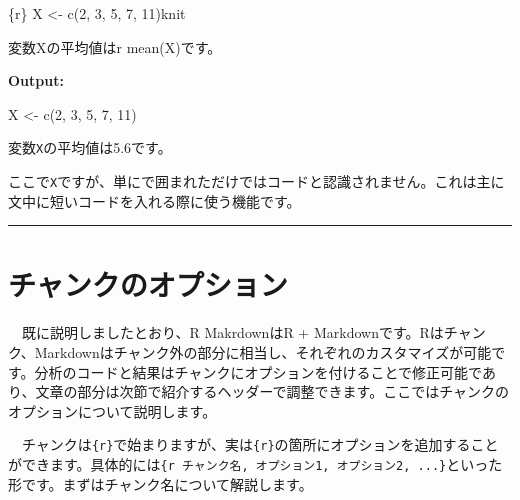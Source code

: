 \documentclass[
  a4paper,
  pandoc,
  ja=standard,
  jafont=haranoaji]{bxjsbook}
\newenvironment{Shaded}{\begin{snugshade}}{\end{snugshade}}
\newcommand{\DecValTok}[1]{\textcolor[rgb]{0.68,0.00,0.00}{#1}}
\newcommand{\FunctionTok}[1]{\textcolor[rgb]{0.28,0.35,0.67}{#1}}
\newcommand{\InformationTok}[1]{\textcolor[rgb]{0.37,0.37,0.37}{#1}}
\newcommand{\NormalTok}[1]{\textcolor[rgb]{0.00,0.48,0.65}{#1}}
\newcommand{\OtherTok}[1]{\textcolor[rgb]{0.00,0.48,0.65}{#1}}
\begin{document}
\begin{Shaded}
\begin{Highlighting}[]
\InformationTok{\textasciigrave{}\textasciigrave{}\textasciigrave{}\{r\}}
\NormalTok{X }\OtherTok{\textless{}{-}} \FunctionTok{c}\NormalTok{(}\DecValTok{2}\NormalTok{, }\DecValTok{3}\NormalTok{, }\DecValTok{5}\NormalTok{, }\DecValTok{7}\NormalTok{, }\DecValTok{11}\NormalTok{)knit}
\InformationTok{\textasciigrave{}\textasciigrave{}\textasciigrave{}}

\NormalTok{変数}\InformationTok{\textasciigrave{}X\textasciigrave{}}\NormalTok{の平均値は}\InformationTok{\textasciigrave{}r mean(X)\textasciigrave{}}\NormalTok{です。}
\end{Highlighting}
\end{Shaded}

\textbf{Output:}

\begin{Shaded}
\begin{Highlighting}[]
\NormalTok{X }\OtherTok{\textless{}{-}} \FunctionTok{c}\NormalTok{(}\DecValTok{2}\NormalTok{, }\DecValTok{3}\NormalTok{, }\DecValTok{5}\NormalTok{, }\DecValTok{7}\NormalTok{, }\DecValTok{11}\NormalTok{)}
\end{Highlighting}
\end{Shaded}

変数\texttt{X}の平均値は5.6です。

ここで\texttt{\textasciigrave{}X\textasciigrave{}}ですが、単に\texttt{\textasciigrave{}}で囲まれただけではコードと認識されません。これは主に文中に短いコードを入れる際に使う機能です。

\begin{center}\rule{0.5\linewidth}{0.5pt}\end{center}

\hypertarget{sec-rmarkdown_chunk}{%
\section{チャンクのオプション}\label{sec-rmarkdown_chunk}}

　既に説明しましたとおり、R MakrdownはR +
Markdownです。Rはチャンク、Markdownはチャンク外の部分に相当し、それぞれのカスタマイズが可能です。分析のコードと結果はチャンクにオプションを付けることで修正可能であり、文章の部分は次節で紹介するヘッダーで調整できます。ここではチャンクのオプションについて説明します。

　チャンクは\texttt{\textasciigrave{}\textasciigrave{}\textasciigrave{}\{r\}}で始まりますが、実は\texttt{\{r\}}の箇所にオプションを追加することができます。具体的には\texttt{\{r\ チャンク名,\ オプション1,\ オプション2,\ ...\}}といった形です。まずはチャンク名について解説します。
\end{document}
